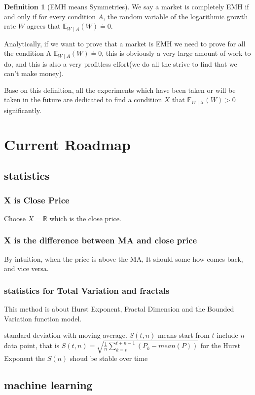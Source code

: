 \documentclass{article}
\theoremstyle{definition} %
\newtheorem{definition}{Definition}[section]
\begin{document}
\begin{definition}[EMH means Symmetries]
    \label{def:mydefinition}
    We say a market is completely EMH if and
    only if for every condition $A$, the random
    variable of the logarithmic growth rate $W$
    agrees that $\mathbb{E}_{W\mid A}(W)\doteq 0$.
\end{definition}

Analytically, if we want to prove that a market is
EMH we need to prove for all the condition A
$\mathbb{E}_{W\mid A}(W)\doteq 0$, this is
obviously a very large amount of work to do, and
this is also a very profitless effort(we do all
the strive to find that we can't make money).

Base on this definition, all the experiments which
have been taken or will be taken in the future
are dedicated to find a condition $X$ that
$\mathbb{E}_{W\mid X}(W)>0$ significantly.

\section{Current Roadmap}
\subsection{statistics}
\subsubsection{X is Close Price}
Choose $X=\mathbb{R}$ which is the close price.
\subsubsection{X is the difference between MA and close price}
By intuition, when the price is above the MA,
It should some how comes back, and vice versa.
\subsubsection{statistics for Total Variation and fractals}
This method is about Hurst Exponent,
Fractal Dimension and the Bounded Variation
function model.

standard deviation with moving average.
$S(t,n)$ means start from
$t$ include $n$ data point,
that is
$S(t,n)=\sqrt{\frac{1}{n}\sum_{k=t}^{t+n-1}
        \left(P_k-mean(P)\right)}$
for the Hurst Exponent the $S(n)$ shoud be
stable over time

\subsection{machine learning}
\end{document}
